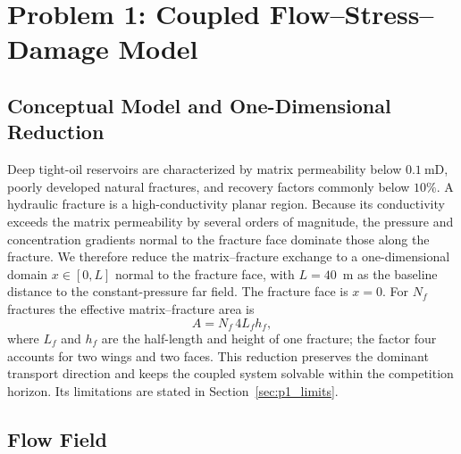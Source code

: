 \section{Problem 1: Coupled Flow--Stress--Damage Model}

\subsection{Conceptual Model and One-Dimensional Reduction}

Deep tight-oil reservoirs are characterized by matrix permeability below
$0.1~\mathrm{mD}$, poorly developed natural fractures, and recovery factors
commonly below $10\%$. A hydraulic fracture is a high-conductivity planar
region. Because its conductivity exceeds the matrix permeability by several
orders of magnitude, the pressure and concentration gradients normal to the
fracture face dominate those along the fracture. We therefore reduce the
matrix--fracture exchange to a one-dimensional domain $x\in[0,L]$ normal to the
fracture face, with $L=40$~m as the baseline distance to the constant-pressure
far field. The fracture face is $x=0$. For $N_f$ fractures the effective
matrix--fracture area is
\begin{equation}
A = N_f\,4L_fh_f,
\label{eq:area}
\end{equation}
where $L_f$ and $h_f$ are the half-length and height of one fracture; the
factor four accounts for two wings and two faces. This reduction preserves the
dominant transport direction and keeps the coupled system solvable within the
competition horizon. Its limitations are stated in
Section~\ref{sec:p1_limits}.

\subsection{Flow Field}

